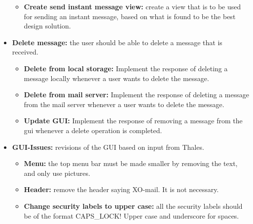 \begin{itemize}
\begin{itemize}
\item{}\textbf{Create send instant message view:} create a view that is to be used for sending an instant message, based on what is found to be the best design solution.
\end{itemize}
\item{}\textbf{Delete message:} the user should be able to delete a message that is received.
\begin{itemize}
\item{}\textbf{Delete from local storage:} Implement the response of deleting a message locally whenever a user wants to delete the message.
\item{}\textbf{Delete from mail server:} Implement the response of deleting a message from the mail server whenever a user wants to delete the message.
\item{}\textbf{Update GUI:} Implement the response of removing a message from the gui whenever a delete operation is completed. 
\end{itemize}
\item{}\textbf{GUI-Issues:} revisions of the GUI based on input from Thales.
\begin{itemize}
\item{}\textbf{Menu:} the top menu bar must be made smaller by removing the text, and only use pictures.
\item{}\textbf{Header:} remove the header saying XO-mail. It is not necessary.
\item{}\textbf{Change security labels to upper case:} all the security labels should be of the format CAPS\_LOCK! Upper case and underscore for spaces.
\end{itemize}
\end{itemize}